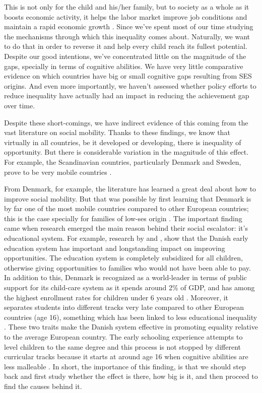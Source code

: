 \documentclass[11pt, a4paper]{article}\usepackage[]{graphicx}\usepackage[]{color}
\begin{document}
This is not only for the child and his/her family, but to society as a whole as it boosts economic activity, it helps the labor market improve job conditions and maintain a rapid economic growth \citep{hanushek2007}. Since \citet{coleman1966} we've spent most of our time studying the mechanisms through which this inequality comes about. Naturally, we want to do that in order to reverse it and help every child reach its fullest potential. Despite our good intentions, we've concentrated little on the magnitude of the gaps, specially in terms of cognitive abilities. We have very little comparative evidence on which countries have big or small cognitive gaps resulting from SES origins. And even more importantly, we haven't assessed whether policy efforts to reduce inequality have actually had an impact in reducing the achievement gap over time.

Despite these short-comings, we have indirect evidence of this coming from the vast literature on social mobility. Thanks to these findings, we know that virtually in all countries, be it developed or developing, there is inequality of opportunity. But there is considerable variation in the magnitude of this effect. For example, the Scandinavian countries, particularly Denmark and Sweden, prove to be very mobile countries \citep{esping2012, breen2007, shavit1993}.

From Denmark, for example, the literature has learned a great deal about how to improve social mobility. But that was possible by first learning that Denmark is by far one of the most mobile countries compared to other European countries; this is the case specially for families of low-ses origin \citep{bjorklund2009, jaeger2007}. The important finding came when research emerged the main reason behind their social escalator: it's educational system. For example, research by \citet{esping_waldfogel2012} and \citet{bauchmuller2014}, show that the Danish early education system has important and longstanding impact on improving opportunities. The education system is completely subsidized for all children, otherwise giving opportunities to families who would not have been able to pay. In addition to this, Denmark is recognized as a world-leader in terms of public support for its child-care system as it spends around 2\% of GDP, and has among the highest enrollment rates for children under 6 years old \citep{esping_waldfogel2012}. Moreover, it separates students into different tracks very late compared to other European countries (age 16), something which has been linked to less educational inequality \citep{hanushek_woesmann_tracking}. These two traits make the Danish system effective in promoting equality relative to the average European country. The early schooling experience attempts to level children to the same degree and this process is not stopped by different curricular tracks because it starts at around age 16 when cognitive abilities are less malleable \citep{heckman_oecd}. In short, the importance of this finding, is that we should step back and first study whether the effect is there, how big is it, and then proceed to find the causes behind it.
\end{document}
